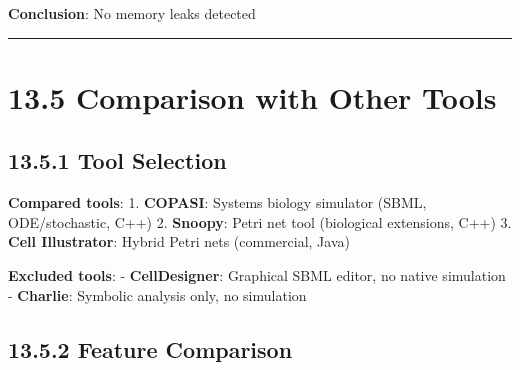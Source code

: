 \textbf{Conclusion}: No memory leaks detected \checkmark

\begin{center}\rule{0.5\linewidth}{0.5pt}\end{center}

\hypertarget{comparison-with-other-tools}{%
\section{13.5 Comparison with Other
Tools}\label{comparison-with-other-tools}}

\hypertarget{tool-selection}{%
\subsection{13.5.1 Tool Selection}\label{tool-selection}}

\textbf{Compared tools}: 1. \textbf{COPASI}: Systems biology simulator
(SBML, ODE/stochastic, C++) 2. \textbf{Snoopy}: Petri net tool
(biological extensions, C++) 3. \textbf{Cell Illustrator}: Hybrid Petri
nets (commercial, Java)

\textbf{Excluded tools}: - \textbf{CellDesigner}: Graphical SBML editor,
no native simulation - \textbf{Charlie}: Symbolic analysis only, no
simulation

\hypertarget{feature-comparison}{%
\subsection{13.5.2 Feature Comparison}\label{feature-comparison}}

